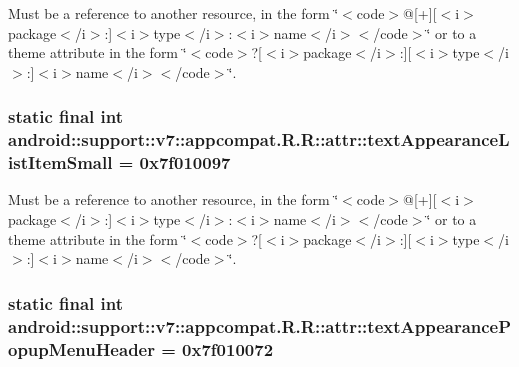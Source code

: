 Must be a reference to another resource, in the form \char`\"{}$<$code$>$@\mbox{[}+\mbox{]}\mbox{[}$<$i$>$package$<$/i$>$:\mbox{]}$<$i$>$type$<$/i$>$:$<$i$>$name$<$/i$>$$<$/code$>$\char`\"{} or to a theme attribute in the form \char`\"{}$<$code$>$?\mbox{[}$<$i$>$package$<$/i$>$:\mbox{]}\mbox{[}$<$i$>$type$<$/i$>$:\mbox{]}$<$i$>$name$<$/i$>$$<$/code$>$\char`\"{}. \hypertarget{classandroid_1_1support_1_1v7_1_1appcompat_1_1_r_1_1attr_26430f8a45a873c796118da3077344b1}{
\subsubsection[{textAppearanceListItemSmall}]{\setlength{\rightskip}{0pt plus 5cm}static final int android::support::v7::appcompat.R.R::attr::textAppearanceListItemSmall = 0x7f010097}}
\label{classandroid_1_1support_1_1v7_1_1appcompat_1_1_r_1_1attr_26430f8a45a873c796118da3077344b1}


Must be a reference to another resource, in the form \char`\"{}$<$code$>$@\mbox{[}+\mbox{]}\mbox{[}$<$i$>$package$<$/i$>$:\mbox{]}$<$i$>$type$<$/i$>$:$<$i$>$name$<$/i$>$$<$/code$>$\char`\"{} or to a theme attribute in the form \char`\"{}$<$code$>$?\mbox{[}$<$i$>$package$<$/i$>$:\mbox{]}\mbox{[}$<$i$>$type$<$/i$>$:\mbox{]}$<$i$>$name$<$/i$>$$<$/code$>$\char`\"{}. \hypertarget{classandroid_1_1support_1_1v7_1_1appcompat_1_1_r_1_1attr_50c70e906c25d53ad01817c28c8bd0fa}{
\subsubsection[{textAppearancePopupMenuHeader}]{\setlength{\rightskip}{0pt plus 5cm}static final int android::support::v7::appcompat.R.R::attr::textAppearancePopupMenuHeader = 0x7f010072}}
\label{classandroid_1_1support_1_1v7_1_1appcompat_1_1_r_1_1attr_50c70e906c25d53ad01817c28c8bd0fa}



